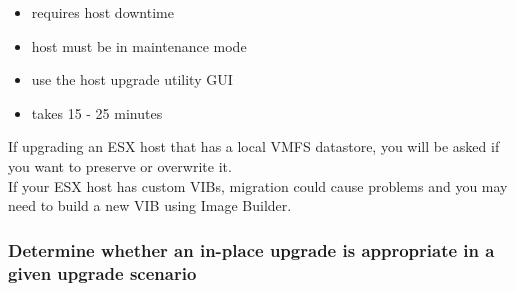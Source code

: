 \begin{itemize}
\item requires host downtime
\item host must be in maintenance mode
\item use the host upgrade utility GUI
\item takes 15 - 25 minutes
\end{itemize}

If upgrading an ESX host that has a local VMFS datastore, you will be asked
if you want to preserve or overwrite it.\\

If your ESX host has custom VIBs, migration could cause problems and you may
need to build a new VIB using Image Builder.

\subsubsection{Determine whether an in-place upgrade is appropriate in a given upgrade scenario}

